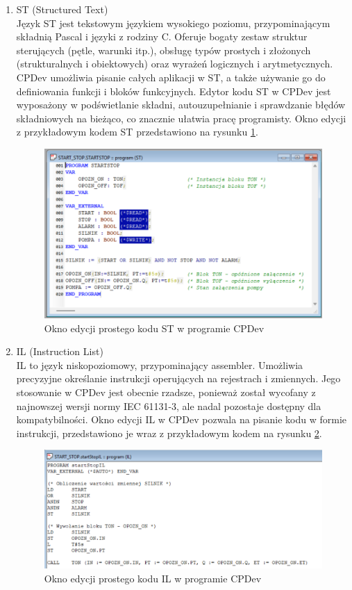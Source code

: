 \documentclass[12pt,twoside]{article}
\begin{document}
\begin{enumerate}[label=\alph*), leftmargin=1.25cm]
    \item ST (Structured Text)\\
    Język ST jest tekstowym językiem wysokiego poziomu, przypominającym składnią Pascal i języki z rodziny C. Oferuje bogaty zestaw struktur sterujących (pętle, warunki itp.), obsługę typów prostych i złożonych (strukturalnych i obiektowych) oraz wyrażeń logicznych i arytmetycznych. CPDev umożliwia pisanie całych aplikacji w ST, a także używanie go do definiowania funkcji i bloków funkcyjnych. Edytor kodu ST w CPDev jest wyposażony w podświetlanie składni, autouzupełnianie i sprawdzanie błędów składniowych na bieżąco, co znacznie ułatwia pracę programisty. Okno edycji z przykładowym kodem ST przedstawiono na rysunku \ref{Fig:startStopST}.

   \begin{figure}[ht]
   \centering
   \includegraphics[width=12cm]{images/startStopST.png}
   \caption{Okno edycji prostego kodu ST w programie CPDev}
   \label{Fig:startStopST}
   \end{figure}

    \item IL (Instruction List)\\
    IL to język niskopoziomowy, przypominający assembler. Umożliwia precyzyjne określanie instrukcji operujących na rejestrach i zmiennych. Jego stosowanie w CPDev jest obecnie rzadsze, ponieważ został wycofany z najnowszej wersji normy IEC 61131-3, ale nadal pozostaje dostępny dla kompatybilności. Okno edycji IL w CPDev pozwala na pisanie kodu w formie instrukcji, przedstawiono je wraz z przykładowym kodem na rysunku \ref{Fig:startStopIL}. 

   \begin{figure}[ht]
   \centering
   \includegraphics[width=13cm]{images/startStopIL.png}
   \caption{Okno edycji prostego kodu IL w programie CPDev}
   \label{Fig:startStopIL}
   \end{figure}


\end{enumerate}
\end{document}

